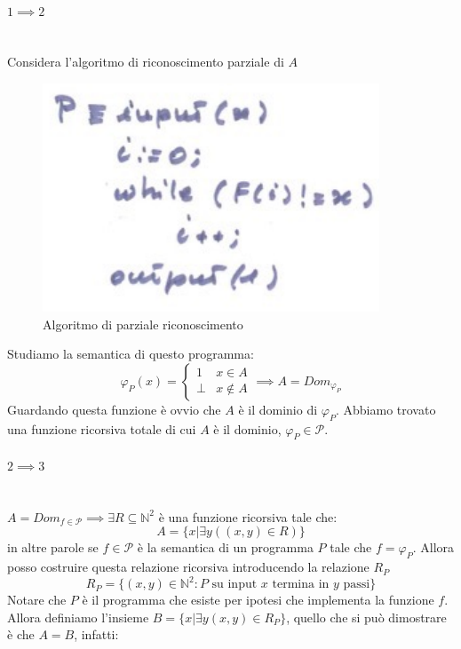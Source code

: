 \documentclass{article}
\begin{document}
\paragraph{$1\implies 2$}\mbox{}\\
Considera l'algoritmo di riconoscimento parziale di $A$
\begin{figure}[H]
    \centering
    \includegraphics[scale=0.6]{images/prog_ricors_rico.png}
    \caption{Algoritmo di parziale riconoscimento}
\end{figure}
Studiamo la semantica di questo programma:
\[
    \varphi_P(x)=
    \begin{cases}
        1    & x\in A    \\
        \bot & x\notin A
    \end{cases}
    \implies A =Dom_{\varphi_P}
\]
Guardando questa funzione è ovvio che $A$ è il dominio di $\varphi_P$. Abbiamo trovato una funzione
ricorsiva totale di cui $A$ è il dominio, $\varphi_P\in\mathcal{P}$.

\paragraph{$2\implies 3$}\mbox{}\\
$A=Dom_{f\in\mathcal{P}}\implies\exists R\subseteq\mathbb{N}^2$ è una funzione ricorsiva tale che:
$$A=\{x|\exists y((x,y)\in R)\}$$
in altre parole se $f\in\mathcal{P}$ è la semantica di un programma $P$ tale che $f=\varphi_P$.
Allora posso costruire questa relazione ricorsiva introducendo la relazione $R_P$
$$R_P=\{(x,y)\in\mathbb{N}^2:P\text{ su input }x\text{ termina in }y\text{ passi}\}$$
Notare che $P$ è il programma che esiste per ipotesi che implementa la funzione $f$. Allora
definiamo l'insieme $B=\{x|\exists y(x,y)\in R_P\}$, quello che si può dimostrare è che $A=B$,
infatti:
\end{document}

